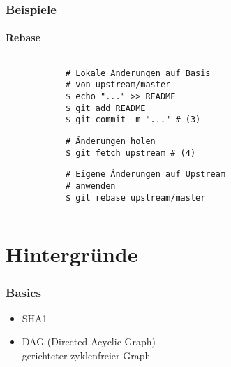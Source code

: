 \documentclass[]{beamer}
\begin{document}
\begin{frame}[fragile]
	\frametitle{Beispiele}
	\framesubtitle{Rebase}
	\begin{columns}[T]
		\begin{column}{7.5cm}
			\begin{verbatim}
			# Lokale Änderungen auf Basis
			# von upstream/master
			$ echo "..." >> README
			$ git add README
			$ git commit -m "..." # (3)
			\end{verbatim}

			\begin{verbatim}
			# Änderungen holen
			$ git fetch upstream # (4)
			\end{verbatim}

			\begin{verbatim}
			# Eigene Änderungen auf Upstream
			# anwenden
			$ git rebase upstream/master
			\end{verbatim}
		\end{column}
		\begin{column}{2.5cm}
		\end{column}
	\end{columns}
\end{frame}

\section{Hintergründe}
\begin{frame}
	\frametitle{Basics}
	\begin{itemize}
		\item
			SHA1
		\item
			DAG (Directed Acyclic Graph)\\
			gerichteter zyklenfreier Graph
	\end{itemize}
\end{frame}
\end{document}
